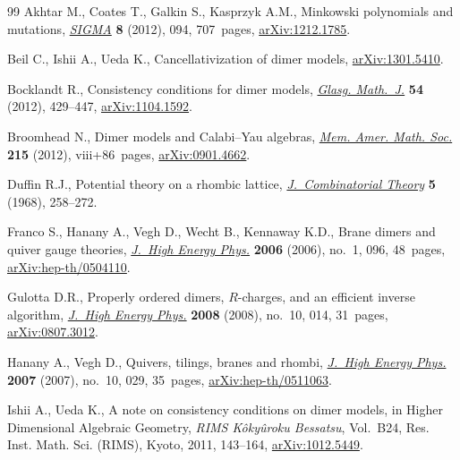 \documentclass[11pt]{article}
\numberwithin{equation}{section}
\numberwithin{equation}{section}
\numberwithin{figure}{section}
\numberwithin{table}{section}
\begin{document}
\begin{thebibliography}{99}
Akhtar M., Coates T., Galkin S., Kasprzyk A.M., Minkowski polynomials and
 mutations, \href{https://doi.org/10.3842/SIGMA.2012.094}{\textit{SIGMA}} \textbf{8} (2012), 094, 707~pages,
 \href{https://arxiv.org/abs/1212.1785}{arXiv:1212.1785}.

Beil C., Ishii A., Ueda K., Cancellativization of dimer models,
 \href{https://arxiv.org/abs/1301.5410}{arXiv:1301.5410}.

Bocklandt R., Consistency conditions for dimer models, \href{https://doi.org/10.1017/S0017089512000080}{\textit{Glasg. Math.~J.}}
 \textbf{54} (2012), 429--447, \href{https://arxiv.org/abs/1104.1592}{arXiv:1104.1592}.

Broomhead N., Dimer models and {C}alabi--{Y}au algebras, \href{https://doi.org/10.1090/S0065-9266-2011-00617-9}{\textit{Mem. Amer.
 Math. Soc.}} \textbf{215} (2012), viii+86~pages, \href{https://arxiv.org/abs/0901.4662}{arXiv:0901.4662}.

Duffin R.J., Potential theory on a rhombic lattice, \href{https://doi.org/10.1016/S0021-9800(68)80072-9}{\textit{J.~Combinatorial
 Theory}} \textbf{5} (1968), 258--272.

Franco S., Hanany A., Vegh D., Wecht B., Kennaway K.D., Brane dimers and quiver
 gauge theories, \href{https://doi.org/10.1088/1126-6708/2006/01/096}{\textit{J.~High Energy Phys.}} \textbf{2006} (2006), no.~1,
 096, 48~pages, \href{https://arxiv.org/abs/hep-th/0504110}{arXiv:hep-th/0504110}.

Gulotta D.R., Properly ordered dimers, {$R$}-charges, and an efficient inverse
 algorithm, \href{https://doi.org/10.1088/1126-6708/2008/10/014}{\textit{J.~High Energy Phys.}} \textbf{2008} (2008), no.~10, 014,
 31~pages, \href{https://arxiv.org/abs/0807.3012}{arXiv:0807.3012}.

Hanany A., Vegh D., Quivers, tilings, branes and rhombi, \href{https://doi.org/10.1088/1126-6708/2007/10/029}{\textit{J.~High Energy
 Phys.}} \textbf{2007} (2007), no.~10, 029, 35~pages, \href{https://arxiv.org/abs/hep-th/0511063}{arXiv:hep-th/0511063}.

Ishii A., Ueda K., A note on consistency conditions on dimer models, in Higher
 Dimensional Algebraic Geometry, \textit{RIMS K\^oky\^uroku Bessatsu}, Vol.~B24, Res. Inst. Math. Sci. (RIMS), Kyoto, 2011, 143--164, \href{https://arxiv.org/abs/1012.5449}{arXiv:1012.5449}.


\end{thebibliography}
\end{document}
